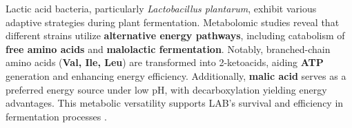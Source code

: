 Lactic acid bacteria, particularly \textit{Lactobacillus plantarum}, exhibit various adaptive strategies during plant fermentation. Metabolomic studies reveal that different strains utilize \textbf{alternative energy pathways}, including catabolism of \textbf{free amino acids} and \textbf{malolactic fermentation}. Notably, branched-chain amino acids (\textbf{Val, Ile, Leu}) are transformed into 2-ketoacids, aiding \textbf{ATP} generation and enhancing energy efficiency. Additionally, \textbf{malic acid} serves as a preferred energy source under low pH, with decarboxylation yielding energy advantages. This metabolic versatility supports LAB's survival and efficiency in fermentation processes \cite*{L8-VegFruit}.





